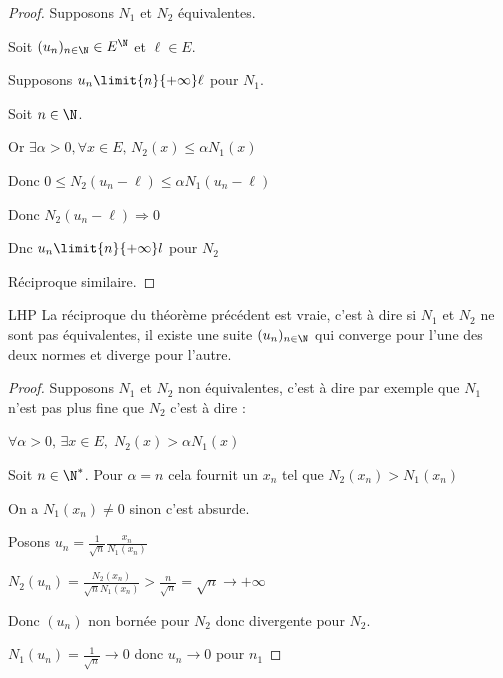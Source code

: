 \begin{proof}
    
    Supposons $N_1$ et $N_2$ équivalentes.

    Soit $(u_n)_{n \in \N} \in E^{\N}$ et $\ell \in E$.

    Supposons $u_n \limit{n}{+\infty} \ell$ pour $N_1$. 

    Soit $n \in \N$. 

    Or $\exists \alpha > 0, \forall x \in E, \, N_2(x) \leqslant \alpha N_1(x)$

    Donc $0 \leqslant N_2(u_n - \ell) \leqslant \alpha N_1(u_n - \ell)$ 

    Donc $N_2(u_n - \ell) \Longrightarrow 0$

    Dnc $u_n \limit{n}{+\infty} l$ pour $N_2$

    Réciproque similaire.
\end{proof}

\begin{theoreme}{LHP}{}
    La réciproque du théorème précédent est vraie, c'est à dire si $N_1$ et $N_2$ ne sont pas 
    équivalentes, il existe une suite $(u_n)_{n \in \N}$ qui converge pour l'une des deux normes 
    et diverge pour l'autre. 
\end{theoreme}


\begin{proof}
    Supposons $N_1$ et $N_2$ non équivalentes, c'est à dire par exemple que $N_1$ n'est pas plus 
    fine que $N_2$ c'est à dire : 

    $\forall \alpha >0, \, \exists x \in E, \; N_2(x) > \alpha N_1(x)$

    Soit $n \in \N^*$. Pour $\alpha = n$ cela fournit un $x_n$ tel que $N_2(x_n) > N_1(x_n)$

    On a $N_1(x_n) \neq 0$ sinon c'est absurde.

    Posons $\displaystyle u_n = \frac 1 {\sqrt n}\frac{x_n}{N_1(x_n)}$

    $\displaystyle N_2(u_n) = \frac{N_2(x_n)}{\sqrt n N_1(x_n)} > \frac n {\sqrt n} = \sqrt n \to + \infty$

    Donc $(u_n)$ non bornée pour $N_2$ donc divergente pour $N_2$. 

    $N_1(u_n) =  \frac 1 {\sqrt n} \to 0$ donc $u_n \to 0$ pour $n_1$
\end{proof}

